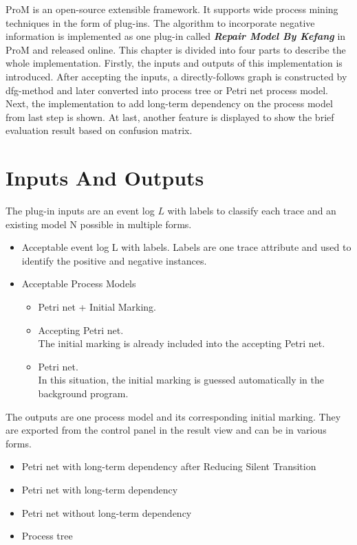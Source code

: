 ProM is an open-source extensible framework. It supports wide process mining techniques in the form of plug-ins\cite{ProM}. The algorithm to incorporate negative information is implemented as one plug-in called \textbf{\emph{Repair Model By Kefang}} in ProM and released online\cite{MyPlugin}. This chapter is divided into four parts to describe the whole implementation. Firstly, the inputs and outputs of this implementation is introduced. After accepting the inputs, a directly-follows graph is constructed by dfg-method and later converted into process tree or Petri net process model. Next, the implementation to add long-term dependency on the process model from last step is shown. At last, another feature is displayed to show the brief evaluation result based on confusion matrix. 
\section{Inputs And Outputs}
The plug-in inputs are an event log $L$ with labels to classify each trace and an existing model N possible in multiple forms.
\begin{itemize}
	\item Acceptable event log L with labels. Labels are one trace attribute and used to identify the positive and negative instances. 
	\item Acceptable Process Models
	\begin{itemize}
		\item Petri net + Initial Marking.
		\item Accepting Petri net. \\
		The initial marking is already included into the accepting Petri net. 
		\item Petri net.\\ In this situation, the initial marking is guessed automatically in the background program.
	\end{itemize}
\end{itemize}

The outputs are one process model and its corresponding initial marking. They are exported from the control panel in the result view and can be in various forms.
\begin{itemize}
	\item Petri net with long-term dependency after Reducing Silent Transition
	\item Petri net with long-term dependency
	\item Petri net without long-term dependency
	\item Process tree
\end{itemize}

